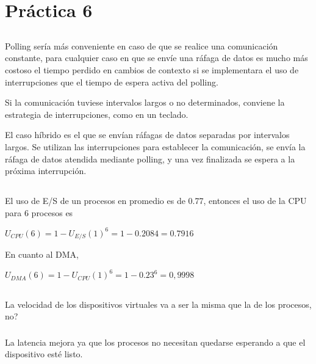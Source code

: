 \section{Práctica 6}

\subsection{}
Polling sería más conveniente en caso de que se realice una comunicación
constante, para cualquier caso en que se envíe una ráfaga de datos es mucho
más costoso el tiempo perdido en cambios de contexto si se implementara el
uso de interrupciones que el tiempo de espera activa del polling.

Si la comunicación tuviese intervalos largos o no determinados, conviene la
estrategia de interrupciones, como en un teclado.

El caso híbrido es el que se envían ráfagas de datos separadas por intervalos
largos. Se utilizan las interrupciones para establecer la comunicación, se
envía la ráfaga de datos atendida mediante polling, y una vez finalizada se
espera a la próxima interrupción.

\subsection{}
El uso de E/S de un procesos en promedio es de 0.77, entonces el uso de la CPU
para 6 procesos es

\begin{center}
$U_{CPU}(6) = 1 - U_{E/S}(1)^6 = 1 - 0.2084 = 0.7916$
\end{center}

En cuanto al DMA,

\begin{center}
$U_{DMA}(6) = 1 - U_{CPU}(1)^6 = 1 - 0.23^6 = 0,9998$
\end{center}

\subsection{}

\subsubsection{}
La velocidad de los dispositivos virtuales va a ser la misma que la de los
procesos, no?

\subsubsection{}
La latencia mejora ya que los procesos no necesitan quedarse esperando a que
el dispositivo esté listo.

